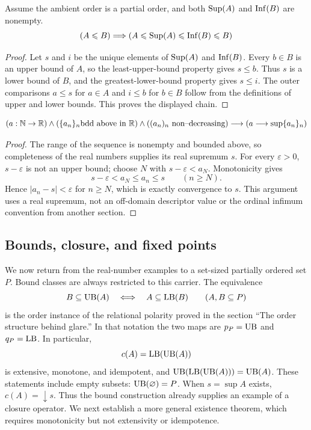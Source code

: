 \begin{theorem}
Assume the ambient order is a partial order, and both $\mathrm{Sup}(A)$ and
$\mathrm{Inf}(B)$ are nonempty.
\[
(A \leqslant B)
\Longrightarrow
(A\leqslant \mathrm{Sup}(A)\leqslant \mathrm{Inf}(B)\leqslant B)
\]
\end{theorem}
\begin{proof}
Let $s$ and $i$ be the unique elements of $\mathrm{Sup}(A)$ and $\mathrm{Inf}(B)$.
Every $b\in B$ is an upper bound of $A$, so the least-upper-bound
property gives $s\leq b$. Thus $s$ is a lower bound of $B$, and the
greatest-lower-bound property gives $s\leq i$. The outer comparisons
$a\leq s$ for $a\in A$ and $i\leq b$ for $b\in B$ follow from the
definitions of upper and lower bounds. This proves the displayed chain.
\end{proof}

\begin{theorem}
\[
(a:\mathbb{N}\rightarrow \mathbb{R})
\land
(\{a_n\}_n \mbox{bdd above in }\mathbb{R})
\land
((a_n)_n\mbox{ non--decreasing})
\longrightarrow
(a \longrightarrow \sup \{a_n\}_n)
\]
\end{theorem}
\begin{proof}
The range of the sequence is nonempty and bounded above, so completeness
of the real numbers supplies its real supremum $s$. For every $\varepsilon>0$,
$s-\varepsilon$ is not an upper bound; choose $N$ with
$s-\varepsilon<a_N$. Monotonicity gives
\[
s-\varepsilon<a_N\leq a_n\leq s\qquad(n\geq N).
\]
Hence $|a_n-s|<\varepsilon$ for $n\geq N$, which is exactly convergence
to $s$. This argument uses a real supremum, not an off-domain descriptor
value or the ordinal infimum convention from another section.
\end{proof}

\subsection{Bounds, closure, and fixed points}
We now return from the real-number examples to a set-sized partially
ordered set $P$. Bound classes are always restricted to this carrier.
The equivalence
\[
B\subseteq\mathrm{UB}(A)\quad\Longleftrightarrow\quad A\subseteq\mathrm{LB}(B)
\qquad(A,B\subseteq P)
\]
is the order instance of the relational polarity proved in the section
``The order structure behind glare.'' In that notation the two maps are
$p_P=\mathrm{UB}$ and $q_P=\mathrm{LB}$. In particular,
\[
c(A)=\mathrm{LB}(\mathrm{UB}(A))
\]
is extensive, monotone, and idempotent, and
$\mathrm{UB}(\mathrm{LB}(\mathrm{UB}(A)))=\mathrm{UB}(A)$. These statements include empty subsets:
$\mathrm{UB}(\varnothing)=P$. When $s=\sup A$ exists, $c(A)=\downarrow s$.
Thus the bound construction already supplies an example of a closure
operator. We next establish a more general existence theorem, which
requires monotonicity but not extensivity or idempotence.

